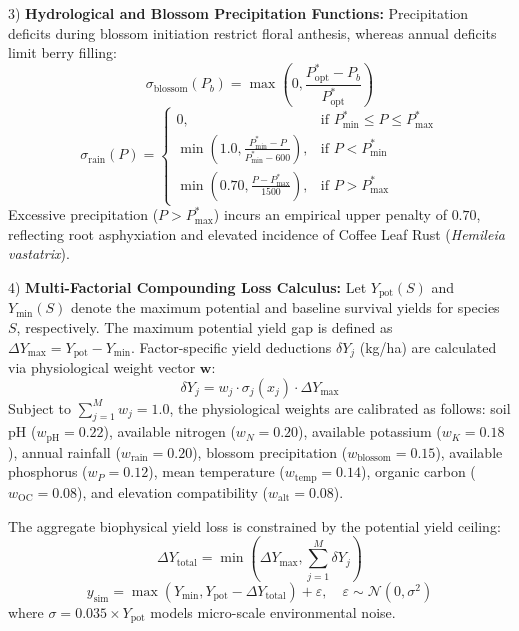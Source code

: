 \documentclass[conference]{IEEEtran}
\begin{document}
3) \textbf{Hydrological and Blossom Precipitation Functions:}
Precipitation deficits during blossom initiation restrict floral anthesis, whereas annual deficits limit berry filling:
\begin{equation}
\sigma_{\text{blossom}}(P_b) = \max\left(0, \frac{P_{\text{opt}}^* - P_b}{P_{\text{opt}}^*}\right)
\end{equation}
\begin{equation}
\sigma_{\text{rain}}(P) = \begin{cases}
0, & \text{if } P_{\text{min}}^* \le P \le P_{\text{max}}^* \\
\min\left(1.0, \frac{P_{\text{min}}^* - P}{P_{\text{min}}^* - 600}\right), & \text{if } P < P_{\text{min}}^* \\
\min\left(0.70, \frac{P - P_{\text{max}}^*}{1500}\right), & \text{if } P > P_{\text{max}}^*
\end{cases}
\end{equation}
Excessive precipitation ($P > P_{\text{max}}^*$) incurs an empirical upper penalty of $0.70$, reflecting root asphyxiation and elevated incidence of Coffee Leaf Rust (\textit{Hemileia vastatrix}).

4) \textbf{Multi-Factorial Compounding Loss Calculus:}
Let $Y_{\text{pot}}(S)$ and $Y_{\text{min}}(S)$ denote the maximum potential and baseline survival yields for species $S$, respectively. The maximum potential yield gap is defined as $\Delta Y_{\text{max}} = Y_{\text{pot}} - Y_{\text{min}}$. Factor-specific yield deductions $\delta Y_j$ (kg/ha) are calculated via physiological weight vector $\mathbf{w}$:
\begin{equation}
\delta Y_j = w_j \cdot \sigma_j(x_j) \cdot \Delta Y_{\text{max}}
\end{equation}
Subject to $\sum_{j=1}^{M} w_j = 1.0$, the physiological weights are calibrated as follows: soil pH ($w_{\text{pH}} = 0.22$), available nitrogen ($w_N = 0.20$), available potassium ($w_K = 0.18$), annual rainfall ($w_{\text{rain}} = 0.20$), blossom precipitation ($w_{\text{blossom}} = 0.15$), available phosphorus ($w_P = 0.12$), mean temperature ($w_{\text{temp}} = 0.14$), organic carbon ($w_{\text{OC}} = 0.08$), and elevation compatibility ($w_{\text{alt}} = 0.08$).

The aggregate biophysical yield loss is constrained by the potential yield ceiling:
\begin{equation}
\Delta Y_{\text{total}} = \min\left(\Delta Y_{\text{max}}, \sum_{j=1}^{M} \delta Y_j\right)
\end{equation}
\begin{equation}
y_{\text{sim}} = \max\left(Y_{\text{min}}, Y_{\text{pot}} - \Delta Y_{\text{total}}\right) + \varepsilon, \quad \varepsilon \sim \mathcal{N}(0, \sigma^2)
\end{equation}
where $\sigma = 0.035 \times Y_{\text{pot}}$ models micro-scale environmental noise.
\end{document}

